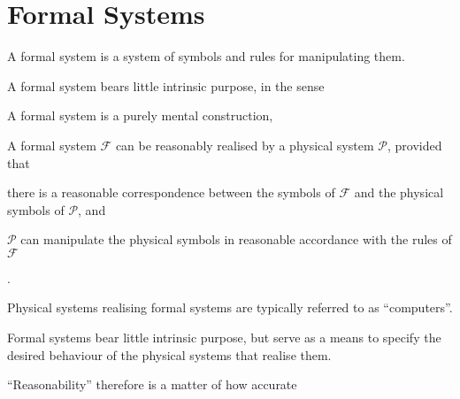 
\section{Formal Systems}

A formal system is a system of symbols and rules for manipulating them.

A formal system bears little intrinsic purpose, in the sense 

A formal system is a purely mental construction, 

A formal system $\mathcal{F}$ can be reasonably realised by a physical system
$\mathcal{P}$, provided that \begin{inparaenum}[(a)]\item there is a reasonable
correspondence between the symbols of $\mathcal{F}$ and the physical symbols of
$\mathcal{P}$, and \item $\mathcal{P}$ can manipulate the physical symbols in
reasonable accordance with the rules of $\mathcal{F}$ \end{inparaenum}.

Physical systems realising formal systems are typically referred to as
``computers''. 

Formal systems bear little intrinsic purpose, but serve as a means to specify
the desired behaviour of the physical systems that realise them.


``Reasonability'' therefore is a matter of how accurate






